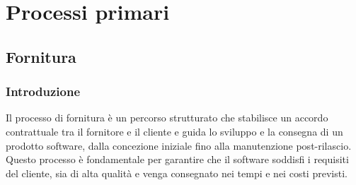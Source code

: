 \section{Processi primari}
\subsection{Fornitura}
\subsubsection{Introduzione}
Il processo di fornitura è un percorso strutturato che stabilisce un accordo contrattuale tra il fornitore e il cliente e guida lo sviluppo e la consegna di un prodotto software, dalla concezione iniziale fino alla manutenzione post-rilascio. Questo processo è fondamentale per garantire che il software soddisfi i requisiti del cliente, sia di alta qualità e venga consegnato nei tempi e nei costi previsti.
